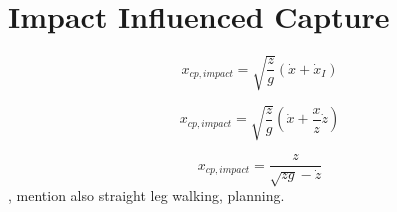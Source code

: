 \section{Impact Influenced Capture}
\begin{equation}
x_{cp,impact} = \sqrt{\frac{z}{g}}(\dot{x}+\dot{x}_I)
\end{equation}

\begin{equation}
x_{cp,impact} = \sqrt{\frac{z}{g}}(\dot{x}+\frac{x}{z}\dot{z})
\end{equation}

\begin{equation}
x_{cp,impact} = \frac{z}{\sqrt{zg}-\dot{z}}
\end{equation}
\cite{kuo2005energetic}, mention also straight leg walking, planning.